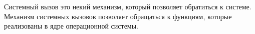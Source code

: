 Системный вызов это некий механизм, который позволяет обратиться к системе. Механизм системных вызовов позволяет обращаться к функциям, которые реализованы в ядре операционной системы.
